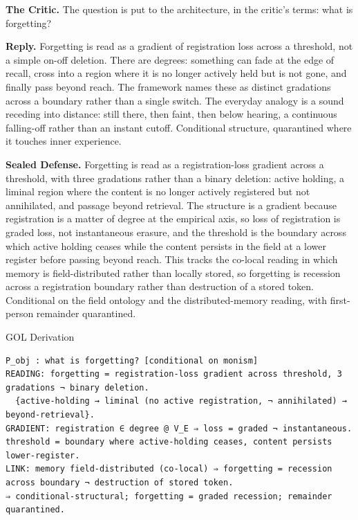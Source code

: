\documentclass[10pt,twocolumn]{article}
\begin{document}
\textbf{The Critic.} The question is put to the architecture, in the
critic's terms: what is forgetting?

\textbf{Reply.} Forgetting is read as a gradient of registration loss
across a threshold, not a simple on-off deletion. There are degrees:
something can fade at the edge of recall, cross into a region where it
is no longer actively held but is not gone, and finally pass beyond
reach. The framework names these as distinct gradations across a
boundary rather than a single switch. The everyday analogy is a sound
receding into distance: still there, then faint, then below hearing, a
continuous falling-off rather than an instant cutoff. Conditional
structure, quarantined where it touches inner experience.

\textbf{Sealed Defense.} Forgetting is read as a registration-loss
gradient across a threshold, with three gradations rather than a binary
deletion: active holding, a liminal region where the content is no
longer actively registered but not annihilated, and passage beyond
retrieval. The structure is a gradient because registration is a matter
of degree at the empirical axis, so loss of registration is graded loss,
not instantaneous erasure, and the threshold is the boundary across
which active holding ceases while the content persists in the field at a
lower register before passing beyond reach. This tracks the co-local
reading in which memory is field-distributed rather than locally stored,
so forgetting is recession across a registration boundary rather than
destruction of a stored token. Conditional on the field ontology and the
distributed-memory reading, with first-person remainder quarantined.

\begin{golbox}{GOL Derivation}
\begin{lstlisting}[style=golv]
P_obj : what is forgetting? [conditional on monism]
READING: forgetting = registration-loss gradient across threshold, 3 gradations ¬ binary deletion.
  {active-holding → liminal (no active registration, ¬ annihilated) → beyond-retrieval}.
GRADIENT: registration ∈ degree @ V_E ⇒ loss = graded ¬ instantaneous. threshold = boundary where active-holding ceases, content persists lower-register.
LINK: memory field-distributed (co-local) ⇒ forgetting = recession across boundary ¬ destruction of stored token.
⇒ conditional-structural; forgetting = graded recession; remainder quarantined.
\end{lstlisting}
\end{golbox}
\end{document}
